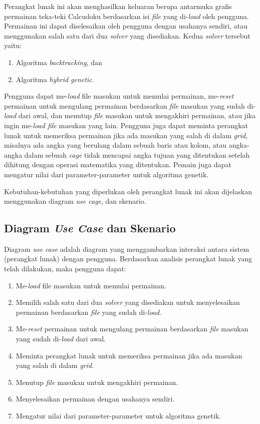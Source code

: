 Perangkat lunak ini akan menghasilkan keluaran berupa antarmuka grafis permainan teka-teki Calcudoku berdasarkan isi \textit{file}  yang di-\textit{load} oleh pengguna. Permainan ini dapat diselesaikan oleh pengguna dengan usahanya sendiri, atau menggunakan salah satu dari dua \textit{solver} yang disediakan.  Kedua \textit{solver} tersebut yaitu:

\begin{enumerate}
\item Algoritma \textit{backtracking}, dan
\item Algoritma \textit{hybrid genetic}.
\end{enumerate}

Pengguna dapat me-\textit{load} file masukan untuk memulai permainan, me-\textit{reset} permainan untuk mengulang permainan berdasarkan \textit{file} masukan yang sudah di-\textit{load} dari awal, dan menutup \textit{file} masukan untuk mengakhiri permainan, atau jika ingin me-\textit{load file} masukan yang lain. Pengguna juga dapat meminta perangkat lunak untuk memeriksa permainan jika ada masukan yang salah di dalam \textit{grid}, misalnya ada angka yang berulang dalam sebuah baris atau kolom, atau angka-angka dalam sebuah \textit{cage} tidak mencapai angka tujuan yang ditentukan setelah dihitung dengan operasi matematika yang ditentukan. Pemain juga dapat mengatur nilai dari parameter-parameter untuk algoritma genetik.

Kebutuhan-kebutuhan yang diperlukan oleh perangkat lunak ini akan dijelaskan menggunakan diagram \textit{use cage}, dan skenario.

\subsection{Diagram \textit{Use Case} dan Skenario}
\label{sec:analisisusecase}

Diagram \textit{use case} adalah diagram yang menggambarkan interaksi antara sistem (perangkat lunak) dengan pengguna. Berdasarkan analisis perangkat lunak yang telah dilakukan, maka pengguna dapat:

\begin{enumerate}
\item Me-\textit{load} file masukan untuk memulai permainan.
\item Memilih salah satu dari dua \textit{solver} yang disediakan untuk menyelesaikan permainan berdasarkan \textit{file} yang sudah di-\textit{load}.
\item Me-\textit{reset} permainan untuk mengulang permainan berdasarkan \textit{file} masukan yang sudah di-\textit{load} dari awal.
\item Meminta perangkat lunak untuk memeriksa permainan jika ada masukan yang salah di dalam \textit{grid}.
\item Menutup \textit{file} masukan untuk mengakhiri permainan.
\item Menyelesaikan permainan dengan usahanya sendiri.
\item Mengatur nilai dari parameter-parameter untuk algoritma genetik.
\end{enumerate}

